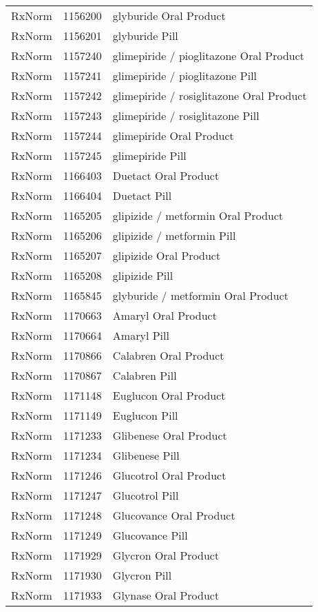 \begin{longtable}{p{}p{}p{}}
  RxNorm & 1156200 & glyburide Oral Product \\ 
  RxNorm & 1156201 & glyburide Pill \\ 
  RxNorm & 1157240 & glimepiride / pioglitazone Oral Product \\ 
  RxNorm & 1157241 & glimepiride / pioglitazone Pill \\ 
  RxNorm & 1157242 & glimepiride / rosiglitazone Oral Product \\ 
  RxNorm & 1157243 & glimepiride / rosiglitazone Pill \\ 
  RxNorm & 1157244 & glimepiride Oral Product \\ 
  RxNorm & 1157245 & glimepiride Pill \\ 
  RxNorm & 1166403 & Duetact Oral Product \\ 
  RxNorm & 1166404 & Duetact Pill \\ 
  RxNorm & 1165205 & glipizide / metformin Oral Product \\ 
  RxNorm & 1165206 & glipizide / metformin Pill \\ 
  RxNorm & 1165207 & glipizide Oral Product \\ 
  RxNorm & 1165208 & glipizide Pill \\ 
  RxNorm & 1165845 & glyburide / metformin Oral Product \\ 
  RxNorm & 1170663 & Amaryl Oral Product \\ 
  RxNorm & 1170664 & Amaryl Pill \\ 
  RxNorm & 1170866 & Calabren Oral Product \\ 
  RxNorm & 1170867 & Calabren Pill \\ 
  RxNorm & 1171148 & Euglucon Oral Product \\ 
  RxNorm & 1171149 & Euglucon Pill \\ 
  RxNorm & 1171233 & Glibenese Oral Product \\ 
  RxNorm & 1171234 & Glibenese Pill \\ 
  RxNorm & 1171246 & Glucotrol Oral Product \\ 
  RxNorm & 1171247 & Glucotrol Pill \\ 
  RxNorm & 1171248 & Glucovance Oral Product \\ 
  RxNorm & 1171249 & Glucovance Pill \\ 
  RxNorm & 1171929 & Glycron Oral Product \\ 
  RxNorm & 1171930 & Glycron Pill \\ 
  RxNorm & 1171933 & Glynase Oral Product \\ 

\end{longtable}

